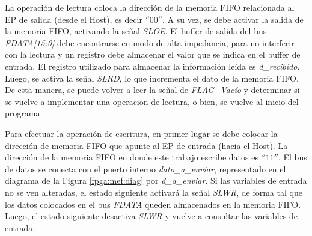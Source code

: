 La operación de lectura coloca la dirección de la memoria FIFO relacionada al EP de salida (desde el Host), es decir $''00''$. A su vez, se debe activar la salida de la memoria FIFO, activando la señal {\it SLOE}. El buffer de salida del bus {\it FDATA[15:0]} debe encontrarse en modo de alta impedancia, para no interferir con la lectura y un registro debe almacenar el valor que se indica en el buffer de entrada. El registro utilizado para almacenar la información leída es {\it d\_recibido}. Luego, se activa la señal {\it SLRD}, lo que incrementa el dato de la memoria FIFO. De esta manera, se puede volver a leer la señal de {\it FLAG\_Vacío} y determinar si se vuelve a implementar una operacion de lectura, o bien, se vuelve al inicio del programa.
 
Para efectuar la operación de escritura, en primer lugar se debe colocar la dirección de memoria FIFO que apunte al EP de entrada (hacia el Host). La dirección de la memoria FIFO en donde este trabajo escribe datos es $''11''$.  El bus de datos se conecta con el puerto interno {\it dato\_a\_enviar}, representado en el diagrama de la Figura \ref{fpga:mef:diag} por {\it d\_a\_enviar}. Si las variables de entrada no se ven alteradas, el estado siguiente activará la señal {\it SLWR}, de forma tal que los datos colocados en el bus {\it FDATA} queden almacenados en la memoria FIFO. Luego, el estado siguiente desactiva {\it SLWR} y vuelve a consultar las variables de entrada.

%

